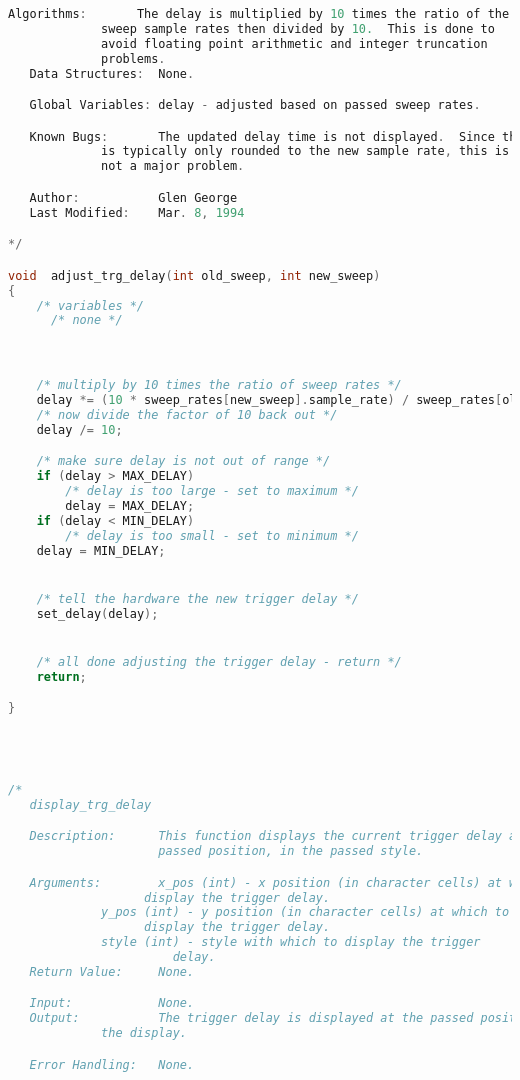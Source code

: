 \begin{lstlisting}[language=C]
   Algorithms:       The delay is multiplied by 10 times the ratio of the
   		     sweep sample rates then divided by 10.  This is done to
		     avoid floating point arithmetic and integer truncation
		     problems.
   Data Structures:  None.

   Global Variables: delay - adjusted based on passed sweep rates.

   Known Bugs:       The updated delay time is not displayed.  Since the time
   		     is typically only rounded to the new sample rate, this is
		     not a major problem.

   Author:           Glen George
   Last Modified:    Mar. 8, 1994

*/

void  adjust_trg_delay(int old_sweep, int new_sweep)
{
    /* variables */
      /* none */



    /* multiply by 10 times the ratio of sweep rates */
    delay *= (10 * sweep_rates[new_sweep].sample_rate) / sweep_rates[old_sweep].sample_rate;
    /* now divide the factor of 10 back out */
    delay /= 10;

    /* make sure delay is not out of range */
    if (delay > MAX_DELAY)
        /* delay is too large - set to maximum */
        delay = MAX_DELAY;
    if (delay < MIN_DELAY)
        /* delay is too small - set to minimum */
	delay = MIN_DELAY;


    /* tell the hardware the new trigger delay */
    set_delay(delay);


    /* all done adjusting the trigger delay - return */
    return;

}




/*
   display_trg_delay

   Description:      This function displays the current trigger delay at the
                     passed position, in the passed style.

   Arguments:        x_pos (int) - x position (in character cells) at which to
   				   display the trigger delay.
   		     y_pos (int) - y position (in character cells) at which to
   				   display the trigger delay.
		     style (int) - style with which to display the trigger
		     		   delay.
   Return Value:     None.

   Input:            None.
   Output:           The trigger delay is displayed at the passed position on
   		     the display.

   Error Handling:   None.


\end{lstlisting}
